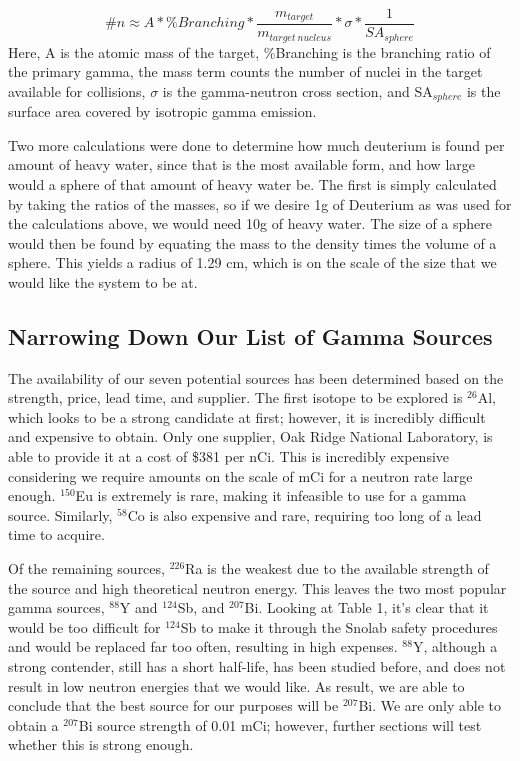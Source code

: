 \documentclass[%
12pt,
twoside,
reprint,
amsmath,amssymb,
aps,
]{article}
\begin{document}
	\begin{equation}
	\#n \approx A * \% Branching * \frac{m_{target}}{m_{target\ nucleus}} * \sigma * \frac{1}{SA_{sphere}}
	\end{equation}
	Here, A is the atomic mass of the target, \%Branching is the branching ratio of the primary gamma, the mass term counts the number of nuclei in the target available for collisions, $\sigma$ is the gamma-neutron cross section, and SA$_{sphere}$ is the surface area covered by isotropic gamma emission.
	\par Two more calculations were done to determine how much deuterium is found per amount of heavy water, since that is the most available form, and how large would a sphere of that amount of heavy water be. The first is simply calculated by taking the ratios of the masses, so if we desire 1g of Deuterium as was used for the calculations above, we would need 10g of heavy water. The size of a sphere would then be found by equating the mass to the density times the volume of a sphere. This yields a radius of 1.29 cm, which is on the scale of the size that we would like the system to be at.
	
	\subsection{Narrowing Down Our List of Gamma Sources}
	\par The availability of our seven potential sources has been determined based on the strength, price, lead time, and supplier. The first isotope to be explored is $^{26}$Al, which looks to be a strong candidate at first; however, it is incredibly difficult and expensive to obtain. Only one supplier, Oak Ridge National Laboratory, is able to provide it at a cost of \$381 per nCi. This is incredibly expensive considering we require amounts on the scale of mCi for a neutron rate large enough. $^{150}$Eu is extremely is rare, making it infeasible to use for a gamma source. Similarly, $^{58}$Co is also expensive and rare, requiring too long of a lead time to acquire.
	\par Of the remaining sources, $^{226}$Ra is the weakest due to the available strength of the source and high theoretical neutron energy. This leaves the two most popular gamma sources, $^{88}$Y and $^{124}$Sb, and $^{207}$Bi. Looking at Table 1, it's clear that it would be too difficult for $^{124}$Sb to make it through the Snolab safety procedures and would be replaced far too often, resulting in high expenses. $^{88}$Y, although a strong contender, still has a short half-life, has been studied before, and does not result in low neutron energies that we would like. As result, we are able to conclude that the best source for our purposes will be $^{207}$Bi. We are only able to obtain a $^{207}$Bi source strength of 0.01 mCi; however, further sections will test whether this is strong enough.
	
\end{document}
